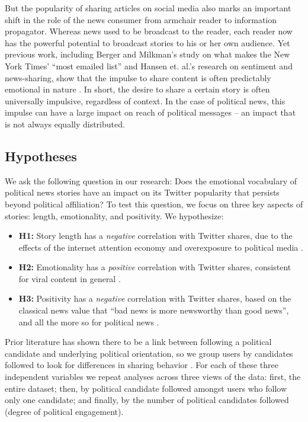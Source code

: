\documentclass[letterpaper]{article}
\begin{document}
But the popularity of sharing articles on social media also marks an important shift in the role of the news consumer from armchair reader to information propagator. Whereas news used to be broadcast to the reader, each reader now has the powerful potential to broadcast stories to his or her own audience. Yet previous work, including Berger and Milkman's study on what makes the New York Times' ``most emailed list'' and Hansen et. al.'s research on sentiment and news-sharing, show that the impulse to share content is often predictably emotional in nature \cite{berger2012makes,hansen2011good}. In short, the desire to share a certain story is often universally impulsive, regardless of context. In the case of political news, this impulse can have a large impact on reach of political messages -- an impact that is not always equally distributed. 

 \subsection{Hypotheses}
We ask the following question in our research: Does the emotional vocabulary of political news stories have an impact on its Twitter popularity that persists beyond political affiliation? To test this question, we focus on three key aspects of stories: length, emotionality, and positivity. We hypothesize:

\begin{itemize} 
    \item \textbf{H1:} Story length has a \emph{negative} correlation with Twitter shares, due to the effects of the internet attention economy and overexposure to political media \cite{goldhaber1997attention}.
    \item \textbf{H2:} Emotionality has a \emph{positive} correlation with Twitter shares, consistent for viral content in general \cite{berger2012makes}.
    \item \textbf{H3:} Positivity has a \emph{negative} correlation with Twitter shares, based on the classical news value that ``bad news is more newsworthy than good news'', and all the more so for political news \cite{galtung1965structure}. 

\end{itemize}

Prior literature has shown there to be a link between following a political candidate and underlying political orientation, so we group users by candidates followed to look for differences in sharing behavior \cite{colleoni2014echo}. For each of these three independent variables we repeat analyses across three views of the data: first, the entire dataset; then, by political candidate followed amongst users who follow only one candidate; and finally, by the number of political candidates followed (degree of political engagement). 
\end{document}
